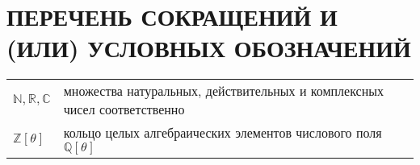 \chapter*{\MakeUppercase{Перечень сокращений и (или) условных обозначений}}

\begin{longtable}{p{}p{}}
    $\mathbb{N}, \mathbb{R}, \mathbb{C}$ & множества натуральных, действительных и
комплексных чисел соответственно\\

    $\mathbb{Z}[\theta]$ & кольцо целых алгебраических элементов числового поля $\mathbb{Q}[\theta]$\\
\end{longtable}

\newpage
